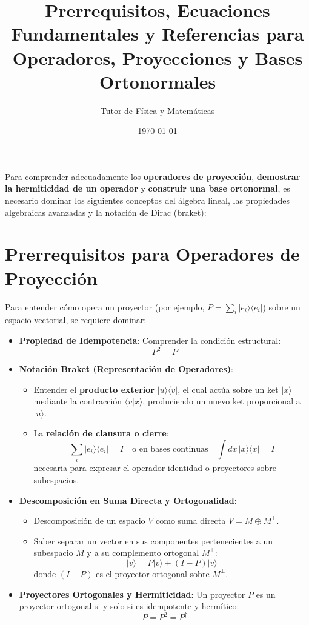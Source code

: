 \documentclass{article}
\title{Prerrequisitos, Ecuaciones Fundamentales y Referencias para Operadores, Proyecciones y Bases Ortonormales}
\author{Tutor de Física y Matemáticas}
\date{\today}
\begin{document}
\maketitle

Para comprender adecuadamente los \textbf{operadores de proyección}, \textbf{demostrar la hermiticidad de un operador} y \textbf{construir una base ortonormal}, es necesario dominar los siguientes conceptos del álgebra lineal, las propiedades algebraicas avanzadas y la notación de Dirac (braket):

\section{Prerrequisitos para Operadores de Proyección}

Para entender cómo opera un proyector (por ejemplo, $P = \sum_{i} |e_i\rangle\langle e_i|$) sobre un espacio vectorial, se requiere dominar:

\begin{itemize}
    \item \textbf{Propiedad de Idempotencia}: Comprender la condición estructural:
    \[
    P^2 = P
    \]
    \item \textbf{Notación Braket (Representación de Operadores)}:
    \begin{itemize}

        \item Entender el \textbf{producto exterior} $|u\rangle\langle v|$, el cual actúa sobre un ket $|x\rangle$ mediante la contracción $\langle v|x\rangle$, produciendo un nuevo ket proporcional a $|u\rangle$.
        \item La \textbf{relación de clausura o cierre}:
        \[
        \sum_i |e_i\rangle\langle e_i| = I \quad \text{o en bases continuas} \quad \int dx \, |x\rangle\langle x| = I
        \]
        necesaria para expresar el operador identidad o proyectores sobre subespacios.
    \end{itemize}
    \item \textbf{Descomposición en Suma Directa y Ortogonalidad}:
    \begin{itemize}
        \item Descomposición de un espacio $V$ como suma directa $V = M \oplus M^\perp$.
        \item Saber separar un vector en sus componentes pertenecientes a un subespacio $M$ y a su complemento ortogonal $M^\perp$:
        \[
        |v\rangle = P|v\rangle + (I - P)|v\rangle
        \]
        donde $(I - P)$ es el proyector ortogonal sobre $M^\perp$.
    \end{itemize}
    \item \textbf{Proyectores Ortogonales y Hermiticidad}:
    Un proyector $P$ es un proyector ortogonal si y solo si es idempotente y hermítico:
    \[
    P = P^2 = P^\dagger
    \]
\end{itemize}
\end{document}
